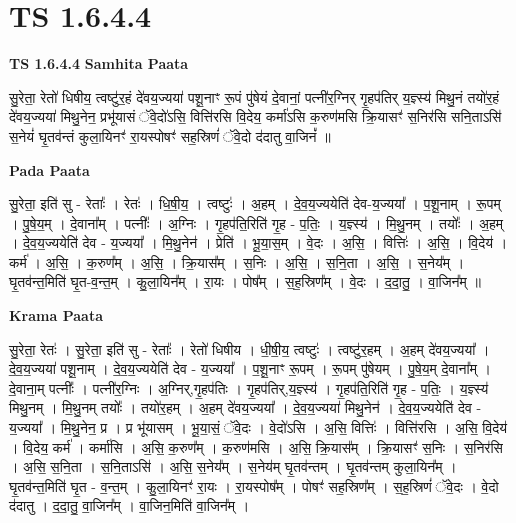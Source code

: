 \documentclass[17pt]{extarticle}
\begin{document}
\section*{ TS 1.6.4.4 }

\textbf{TS 1.6.4.4 } \newline
\textbf{Samhita Paata} \newline

सु॒रेता॒ रेतो॑ धिषीय॒ त्वष्टु॑र॒हं दे॑वय॒ज्यया॑ पशू॒नाꣳ रू॒पं पु॑षेयं दे॒वानां॒ पत्नी॑र॒ग्निर् गृ॒हप॑तिर् य॒ज्ञ्स्य॑ मिथु॒नं तयो॑र॒हं दे॑वय॒ज्यया॑ मिथु॒नेन॒ प्रभू॑यासं ॅवे॒दो॑ऽसि॒ वित्ति॑रसि वि॒देय॒ कर्मा॑ऽसि क॒रुण॑मसि क्रि॒यासꣳ॑ स॒निर॑सि सनि॒ताऽसि॑ स॒नेयं॑ घृ॒तव॑न्तं कुला॒यिनꣳ॑ रा॒यस्पोषꣳ॑ सह॒स्रिणं॑ ॅवे॒दो द॑दातु वा॒जिनं᳚ ॥ \newline

\textbf{Pada Paata} \newline

सु॒रेता॒ इति॑ सु - रेताः᳚ । रेतः॑ । धि॒षी॒य॒ । त्वष्टुः॑ । अ॒हम् । दे॒व॒य॒ज्ययेति॑ देव-य॒ज्यया᳚ । प॒शू॒नाम् । रू॒पम् । पु॒षे॒य॒म् । दे॒वाना᳚म् । पत्नीः᳚ । अ॒ग्निः । गृ॒हप॑ति॒रिति॑ गृ॒ह - प॒तिः॒ । य॒ज्ञ्स्य॑ । मि॒थु॒नम् । तयोः᳚ । अ॒हम् । दे॒व॒य॒ज्ययेति॑ देव - य॒ज्यया᳚ । मि॒थु॒नेन॑ । प्रेति॑ । भू॒या॒स॒म् । वे॒दः । अ॒सि॒ । वित्तिः॑ । अ॒सि॒ । वि॒देय॑ । कर्म॑ । अ॒सि॒ । क॒रुण᳚म् । अ॒सि॒ । क्रि॒यास᳚म् । स॒निः । अ॒सि॒ । स॒नि॒ता । अ॒सि॒ । स॒नेय᳚म् । घृ॒तव॑न्त॒मिति॑ घृ॒त-व॒न्त॒म् । कु॒ला॒यिन᳚म् । रा॒यः । पोष᳚म् । स॒ह॒स्रिण᳚म् । वे॒दः । द॒दा॒तु॒ । वा॒जिन᳚म् ॥  \newline


\textbf{Krama Paata} \newline

सु॒रेता॒ रेतः॑ । सु॒रेता॒ इति॑ सु - रेताः᳚ । रेतो॑ धिषीय । धी॒षी॒य॒ त्वष्टुः॑ । त्वष्टु॑र॒हम् । अ॒हम् दे॑वय॒ज्यया᳚ । दे॒व॒य॒ज्यया॑ पशू॒नाम् । दे॒व॒य॒ज्ययेति॑ देव - य॒ज्यया᳚ । प॒शू॒नाꣳ रू॒पम् । रू॒पम् पु॑षेयम् । पु॒षे॒य॒म् दे॒वाना᳚म् । दे॒वाना॒म् पत्नीः᳚ । पत्नी॑र॒ग्निः । अ॒ग्निर्,गृ॒हप॑तिः । गृ॒हप॑तिर्,य॒ज्ञ्स्य॑ । गृ॒हप॑ति॒रिति॑ गृ॒ह - प॒तिः॒ । य॒ज्ञ्स्य॑ मिथु॒नम् । मि॒थु॒नम् तयोः᳚ । तयो॑र॒हम् । अ॒हम् दे॑वय॒ज्यया᳚ । दे॒व॒य॒ज्यया॑ मिथु॒नेन॑ । दे॒व॒य॒ज्ययेति॑ देव - य॒ज्यया᳚ । मि॒थु॒नेन॒ प्र । प्र भू॑यासम् । भू॒या॒सं॒ ॅवे॒दः । वे॒दो॑ऽसि । अ॒सि॒ वित्तिः॑ । वित्ति॑रसि । अ॒सि॒ वि॒देय॑ । वि॒देय॒ कर्म॑ । कर्मा॑सि । अ॒सि॒ क॒रुण᳚म् । क॒रुण॑मसि । अ॒सि॒ क्रि॒यास᳚म् । क्रि॒यासꣳ॑ स॒निः । स॒निर॑सि । अ॒सि॒ स॒नि॒ता । स॒नि॒ताऽसि॑ । अ॒सि॒ स॒नेय᳚म् । स॒नेय॑म् घृ॒तव॑न्तम् । घृ॒तव॑न्तम् कुला॒यिन᳚म् । घृ॒तव॑न्त॒मिति॑ घृ॒त - व॒न्त॒म् । कु॒ला॒यिनꣳ॑ रा॒यः । रा॒यस्पोष᳚म् । पोषꣳ॑ सह॒स्रिण᳚म् । स॒ह॒स्रिणं॑ ॅवे॒दः । वे॒दो द॑दातु । द॒दा॒तु॒ वा॒जिन᳚म् । वा॒जिन॒मिति॑ वा॒जिन᳚म् । \newline
\end{document}

